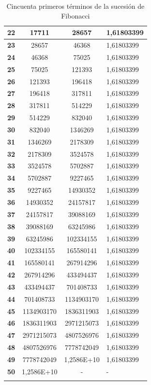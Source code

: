 \begin{longtable}[H]{|c|c|c|l|}
\textbf{22} & 17711 & 28657 & 1,61803399 \\ \hline
\textbf{23} & 28657 & 46368 & 1,61803399 \\ \hline
\textbf{24} & 46368 & 75025 & 1,61803399 \\ \hline
\textbf{25} & 75025 & 121393 & 1,61803399 \\ \hline
\textbf{26} & 121393 & 196418 & 1,61803399 \\ \hline
\textbf{27} & 196418 & 317811 & 1,61803399 \\ \hline
\textbf{28} & 317811 & 514229 & 1,61803399 \\ \hline
\textbf{29} & 514229 & 832040 & 1,61803399 \\ \hline
\textbf{30} & 832040 & 1346269 & 1,61803399 \\ \hline
\textbf{31} & 1346269 & 2178309 & 1,61803399 \\ \hline
\textbf{32} & 2178309 & 3524578 & 1,61803399 \\ \hline
\textbf{33} & 3524578 & 5702887 & 1,61803399 \\ \hline
\textbf{34} & 5702887 & 9227465 & 1,61803399 \\ \hline
\textbf{35} & 9227465 & 14930352 & 1,61803399 \\ \hline
\textbf{36} & 14930352 & 24157817 & 1,61803399 \\ \hline
\textbf{37} & 24157817 & 39088169 & 1,61803399 \\ \hline
\textbf{38} & 39088169 & 63245986 & 1,61803399 \\ \hline
\textbf{39} & 63245986 & 102334155 & 1,61803399 \\ \hline
\textbf{40} & 102334155 & 165580141 & 1,61803399 \\ \hline
\textbf{41} & 165580141 & 267914296 & 1,61803399 \\ \hline
\textbf{42} & 267914296 & 433494437 & 1,61803399 \\ \hline
\textbf{43} & 433494437 & 701408733 & 1,61803399 \\ \hline
\textbf{44} & 701408733 & 1134903170 & 1,61803399 \\ \hline
\textbf{45} & 1134903170 & 1836311903 & 1,61803399 \\ \hline
\textbf{46} & 1836311903 & 2971215073 & 1,61803399 \\ \hline
\textbf{47} & 2971215073 & 4807526976 & 1,61803399 \\ \hline
\textbf{48} & 4807526976 & 7778742049 & 1,61803399 \\ \hline
\textbf{49} & 7778742049 & 1,2586E+10 & 1,61803399 \\ \hline
\textbf{50} & 1,2586E+10 & - & - \\ \hline
\caption{Cincuenta primeros términos de la sucesión de Fibonacci}
\label{tabla:fibonacci50}
\end{longtable}


